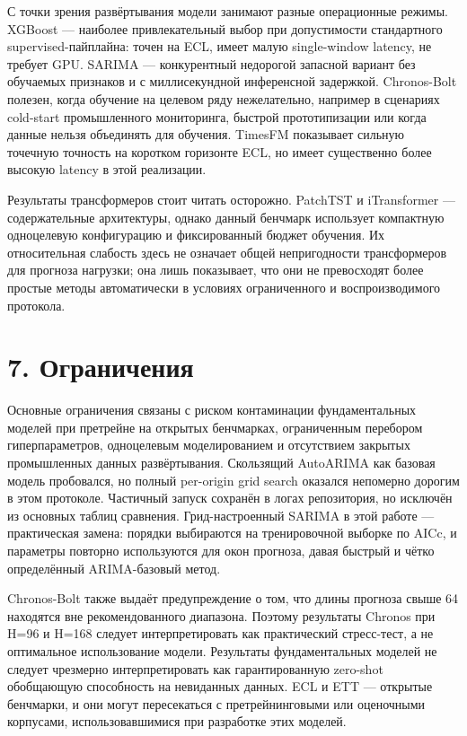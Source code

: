 С точки зрения развёртывания модели занимают разные операционные режимы.
XGBoost --- наиболее привлекательный выбор при допустимости стандартного
supervised-пайплайна: точен на ECL, имеет малую single-window latency,
не требует GPU. SARIMA --- конкурентный недорогой запасной вариант без
обучаемых признаков и с миллисекундной инференсной задержкой.
Chronos-Bolt полезен, когда обучение на целевом ряду нежелательно,
например в сценариях cold-start промышленного мониторинга, быстрой
прототипизации или когда данные нельзя объединять для обучения. TimesFM
показывает сильную точечную точность на коротком горизонте ECL, но имеет
существенно более высокую latency в этой реализации.

Результаты трансформеров стоит читать осторожно. PatchTST и iTransformer
--- содержательные архитектуры, однако данный бенчмарк использует
компактную одноцелевую конфигурацию и фиксированный бюджет обучения. Их
относительная слабость здесь не означает общей непригодности
трансформеров для прогноза нагрузки; она лишь показывает, что они не
превосходят более простые методы автоматически в условиях ограниченного
и воспроизводимого протокола.

\section{7.
Ограничения}\label{ux43eux433ux440ux430ux43dux438ux447ux435ux43dux438ux44f}

Основные ограничения связаны с риском контаминации фундаментальных
моделей при претрейне на открытых бенчмарках, ограниченным перебором
гиперпараметров, одноцелевым моделированием и отсутствием закрытых
промышленных данных развёртывания. Скользящий AutoARIMA как базовая
модель пробовался, но полный per-origin grid search оказался непомерно
дорогим в этом протоколе. Частичный запуск сохранён в логах репозитория,
но исключён из основных таблиц сравнения. Грид-настроенный SARIMA в этой
работе --- практическая замена: порядки выбираются на тренировочной
выборке по AICc, и параметры повторно используются для окон прогноза,
давая быстрый и чётко определённый ARIMA-базовый метод.

Chronos-Bolt также выдаёт предупреждение о том, что длины прогноза свыше
64 находятся вне рекомендованного диапазона. Поэтому результаты Chronos
при H=96 и H=168 следует интерпретировать как практический стресс-тест,
а не оптимальное использование модели. Результаты фундаментальных
моделей не следует чрезмерно интерпретировать как гарантированную
zero-shot обобщающую способность на невиданных данных. ECL и ETT ---
открытые бенчмарки, и они могут пересекаться с претрейнинговыми или
оценочными корпусами, использовавшимися при разработке этих моделей.

